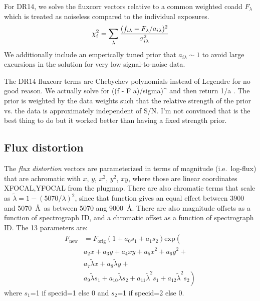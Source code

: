 \documentclass[12pt]{article}
\begin{document}
For DR14, we solve the fluxcorr vectors relative to a common weighted coadd $F_\lambda$ which is treated as noiseless compared to the individual exposures.
\begin{equation}
    \chi^2_i = \sum_\lambda {
        (f_{i\lambda} - F_\lambda / a_{i\lambda})^2 \over
        \sigma_{i\lambda}^2
        }
\end{equation}
We additionally include an emperically tuned prior that $a_{i\lambda} \sim 1$ to avoid large excursions in the solution for very low signal-to-noise data.

 The DR14 fluxcorr terms are Chebychev polynomials instead of Legendre for no
 good reason.  We actually solve for ((f - F a)/sigma)^ and then return 1/a .
 The prior is weighted by the data weights such that the relative strength of
 the prior vs. the data is approximately independent of S/N.  I'm not convinced
 that is the best thing to do but it worked better than having a fixed
 strength prior.


\subsection{Flux distortion}

The {\it flux distortion} vectors are parameterized in terms of magnitude
(i.e.~log-flux) that are achromatic with $x$, $y$, $x^2$, $y^2$, $xy$,
where those are linear coordinates XFOCAL,YFOCAL from the plugmap.
There are also chromatic terms that scale as
$\tilde \lambda = 1-(5070/\lambda)^2$,
since that function gives an equal effect between 3900 and 5070~\AA\
as between 5070 ang 9000~\AA.
There are also magnitude offsets as a function of spectrograph ID,
and a chromatic offset as a function of spectrograph ID.  The 13 parameters are:
\begin{equation}
\begin{split}
    F_\mathrm{new} &= F_\mathrm{orig}
        \left(1 + a_0 s_1 + a_1 s_2 \right) \mathrm{exp} \left( \right. \\
&            a_2 x + a_3 y + a_4 x y + a_5 x^2 + a_6 y^2 + \\
&            a_7 \tilde \lambda x + a_8 \tilde \lambda y + \\
&             a_9 \tilde \lambda s_1 + a_{10} \tilde \lambda s_2 +
             a_{11} \tilde \lambda^2 s_1 + a_{12} \tilde \lambda^2 s_2
        \left. \right)
\end{split}
\end{equation}
where $s_1$=1 if specid=1 else 0 and $s_2$=1 if specid=2 else 0.
\end{document}
